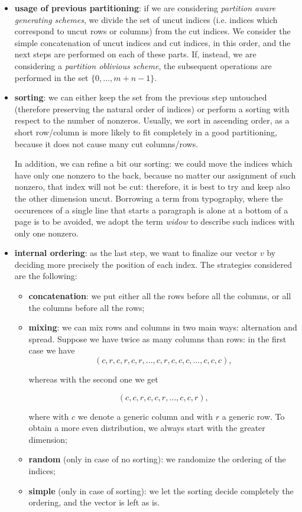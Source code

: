 \begin{itemize}
	\item \textbf{usage of previous partitioning}: if we are considering \emph{partition aware generating schemes}, we divide the set of uncut indices (i.e. indices which correspond to uncut rows or columns) from the  cut indices. We consider the simple concatenation of uncut indices and cut indices, in this order, and the next steps are performed on each of these parts. If, instead, we are considering a \emph{partition oblivious scheme}, the subsequent operations are performed in the set $\{0,\dots,m+n-1\}$.

	\item \textbf{sorting}: we can either keep the set from the previous step untouched (therefore preserving the natural order of indices) or perform a sorting with respect to the number of nonzeros. Usually, we sort in ascending order, as a short row/column is more likely to fit completely in a good partitioning, because it does not cause many cut columns/rows.

In addition, we can refine a bit our sorting: we could move the indices which have only one nonzero to the back, because no matter our assignment of such nonzero, that index will not be cut: therefore, it is best to try and keep also the other dimension uncut. Borrowing a term from typography, where the occurences of a single line that starts a paragraph is alone at a bottom of a page is to be avoided, we adopt the term \emph{widow} to describe such indices with only one nonzero.

\item \textbf{internal ordering}: as the last step, we want to finalize our vector $v$ by deciding more precisely the position of each index. The strategies considered are the following:

	\begin{itemize}
		\item \textbf{concatenation}: we put either all the rows before all the columns, or all the columns before all the rows;
		\item \textbf{mixing}: we can mix rows and columns in two main ways: alternation and spread. Suppose we have twice as many columns than rows: in the first case we have 
			$$(c,r,c,r,c,r,\dots,c,r,c,c,c,\dots,c,c,c),$$
			
			whereas with the second one we get 
			
			$$(c,c,r,c,c,r,\dots,c,c,r),$$
			
			where with $c$ we denote a generic column and with $r$ a generic row. To obtain a more even distribution, we always start with the greater dimension;
		\item \textbf{random} (only in case of no sorting): we randomize the ordering of the indices;
		\item \textbf{simple} (only in case of sorting): we let the sorting decide completely the ordering, and the vector is left as is.
\end{itemize}
\end{itemize}

